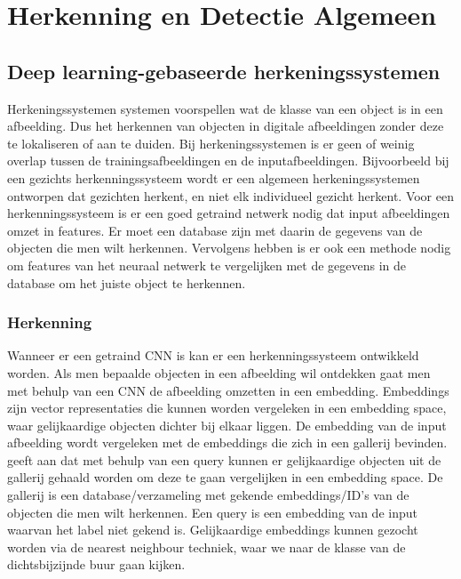 \chapter{Herkenning en Detectie Algemeen}

\section{Deep learning-gebaseerde herkeningssystemen}
Herkeningssystemen systemen voorspellen wat de klasse van een object is in een afbeelding. 
Dus het herkennen van objecten in digitale afbeeldingen zonder deze te lokaliseren of aan te duiden. 
Bij herkeningssystemen is er geen of weinig overlap tussen de trainingsafbeeldingen en de inputafbeeldingen.
Bijvoorbeeld bij een gezichts herkenningssysteem wordt er een algemeen herkeningssystemen ontworpen dat gezichten herkent, en niet elk individueel gezicht herkent.
Voor een herkenningssysteem is er een goed getraind netwerk nodig dat input afbeeldingen omzet in features. 
Er moet een database zijn met daarin de gegevens van de objecten die men wilt herkennen. 
Vervolgens hebben is er ook een methode nodig om features van het neuraal netwerk te vergelijken met de gegevens in de database om het juiste object te herkennen.

\subsection{Herkenning}
Wanneer er een getraind CNN is kan er een herkenningssysteem ontwikkeld worden. 
Als men bepaalde objecten in een afbeelding wil ontdekken gaat men met behulp van een CNN de afbeelding omzetten in een embedding. 
Embeddings \cite{koehrsen_neural_2018} zijn vector representaties die kunnen worden vergeleken in een embedding space, waar gelijkaardige objecten dichter bij elkaar liggen. 
De embedding van de input afbeelding wordt vergeleken met de embeddings die zich in een gallerij bevinden. 
\cite{jiang_deep_2019} geeft aan dat met behulp van een query kunnen er gelijkaardige objecten uit de gallerij gehaald worden om deze te gaan vergelijken in een embedding space. 
De gallerij is een database/verzameling met gekende embeddings/ID's van de objecten die men wilt herkennen.
Een query is een embedding van de input waarvan het label niet gekend is.
Gelijkaardige embeddings kunnen gezocht worden via de nearest neighbour techniek, waar we naar de klasse van de dichtsbijzijnde buur gaan kijken.

